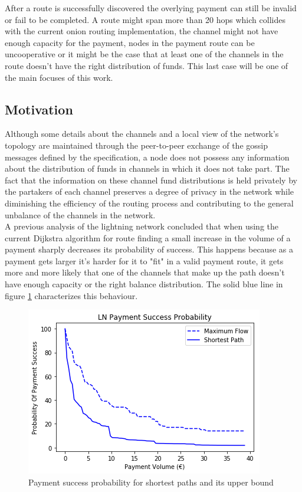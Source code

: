 After a route is successfully discovered the overlying payment can still be invalid or fail to be completed. A route might span more than 20 hops which collides with the current onion routing implementation, the channel might not have enough capacity for the payment, nodes in the payment route can be uncooperative or it might be the case that at least one of the channels in the route doesn't have the right distribution of funds. This last case will be one of the main focuses of this work.

\subsection{Motivation}

Although some details about the channels and a local view of the network's topology are maintained through the peer-to-peer exchange of the gossip messages defined by the specification, a node does not possess any information about the distribution of funds in channels in which it does not take part. The fact that the information on these channel fund distributions is held privately by the partakers of each channel preserves a degree of privacy in the network while diminishing the efficiency of the routing process and contributing to the general unbalance of the channels in the network. \\
A previous analysis of the lightning network \cite{ln_analysis} concluded that when using the current Dijkstra algorithm for route finding a small increase in the volume of a payment sharply decreases its probability of success. This happens because as a payment gets larger it's harder for it to "fit" in a valid payment route, it gets more and more likely that one of the channels that make up the path doesn't have enough capacity or the right balance distribution. The solid blue line in figure \ref{fig:shortest_path_max_flow_prob} characterizes this behaviour.

\begin{figure}[H]
\begin{center}
  \includegraphics[width=0.6\linewidth]{images/shortest_path_max_flow_prob.png}
  \caption{Payment success probability for shortest paths and its upper bound}
  \label{fig:shortest_path_max_flow_prob}
  \end{center}
\end{figure}


